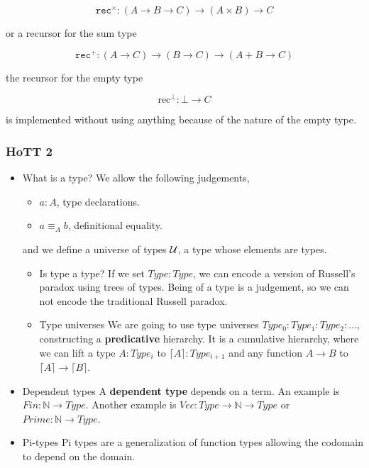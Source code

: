 \documentclass[11pt]{article}
\begin{document}
\begin{itemize}
\[ \mathtt{rec}^{\times} :
(A \to B \to C) \to (A \times B) \to C
\]

or a recursor for the sum type

\[ \mathtt{rec}^+ :
(A \to C) \to (B \to C) \to (A + B \to C)
\]

the recursor for the empty type

\[ \mathrm{rec}^\bot : \bot \to C
\]

is implemented without using anything because of the nature of the
empty type.
\end{itemize}
\subsubsection*{HoTT 2}
\label{sec-9-3-2}
\begin{itemize}
\item What is a type?
\label{sec-9-3-2-1}
We allow the following judgements,

\begin{itemize}
\item $a:A$, type declarations.
\item $a \equiv_{A} b$, definitional equality.
\end{itemize}

and we define a universe of types ${\cal U}$, a type whose elements are types.

\begin{itemize}
\item Is type a type?
\label{sec-9-3-2-1-1}
If we set $Type : Type$, we can encode a version of Russell's paradox
using trees of types. Being of a type is a judgement, so we can not
encode the traditional Russell paradox.

\item Type universes
\label{sec-9-3-2-1-2}
We are going to use type universes $Type_0: Type_1: Type_2 : \dots$,
constructing a \textbf{predicative} hierarchy. It is a cumulative hierarchy,
where we can lift a type $A : Type_{i}$ to $\lceil A\rceil : Type_{i+1}$ and any function
$A \to B$ to $\lceil A\rceil \to \lceil B\rceil$.
\end{itemize}

\item Dependent types
\label{sec-9-3-2-2}
A \textbf{dependent type} depends on a term. An example is $Fin : \mathbb{N} \to Type$.
Another example is $Vec : Type \to \mathbb{N} \to Type$ or $Prime : \mathbb{N} \to Type$.
\item Pi-types
\label{sec-9-3-2-3}
Pi types are a generalization of function types allowing the codomain
to depend on the domain.


\end{itemize}
\end{document}
